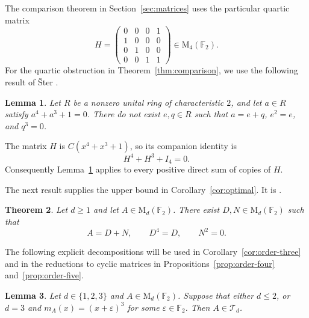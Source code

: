 \documentclass[12pt]{amsart}
\newtheorem{theorem}{Theorem}[section]
\newtheorem{lemma}[theorem]{Lemma}
\theoremstyle{remark}
\numberwithin{equation}{section}
\theoremstyle{definition}
\newcommand{\F}{\mathbb F}
\newcommand{\Mat}{\mathrm M}
\newcommand{\Id}{I}
\newcommand{\TS}{\mathcal T}
\begin{document}
The comparison theorem in Section~\ref{sec:matrices} uses the particular quartic matrix
\begin{equation}\label{eq:H}
 H=\begin{pmatrix}
 0&0&0&1\\
 1&0&0&0\\
 0&1&0&0\\
 0&0&1&1
 \end{pmatrix}\in\Mat_4(\F_2).
\end{equation}
For the quartic obstruction in Theorem~\ref{thm:comparison}, we use the following result of \v{S}ter \cite[Theorem~3, p.~297]{Ster2022}.

\begin{lemma}\label{lem:quartic-obstruction}
Let $R$ be a nonzero unital ring of characteristic $2$, and let $a\in R$ satisfy $a^4+a^3+1=0$. There do not exist $e,q\in R$ such that $a=e+q$, $e^2=e$, and $q^3=0$.
\end{lemma}

The matrix $H$ is $C(x^4+x^3+1)$, so its companion identity is
\begin{equation}\label{eq:H-quartic}
 H^4+H^3+\Id_4=0.
\end{equation}
Consequently Lemma~\ref{lem:quartic-obstruction} applies to every positive direct sum of copies of $H$.

The next result supplies the upper bound in Corollary~\ref{cor:optimal}. It is \cite[Corollary~3.3]{DGLEven}.

\begin{theorem}\label{thm:fourpotent}
Let $d\geq1$ and let $A\in\Mat_d(\F_2)$. There exist $D,N\in\Mat_d(\F_2)$ such that
\[
 A=D+N,\qquad D^4=D,\qquad N^2=0.
\]
\end{theorem}


The following explicit decompositions will be used in Corollary~\ref{cor:order-three} and in the reductions to cyclic matrices in Propositions~\ref{prop:order-four} and~\ref{prop:order-five}.

\begin{lemma}\label{lem:small-blocks}
Let $d\in\{1,2,3\}$ and $A\in\Mat_d(\F_2)$. Suppose that either $d\leq2$, or $d=3$ and $m_A(x)=(x+\varepsilon)^3$ for some $\varepsilon\in\F_2$. Then $A\in\TS_d$.
\end{lemma}
\end{document}
